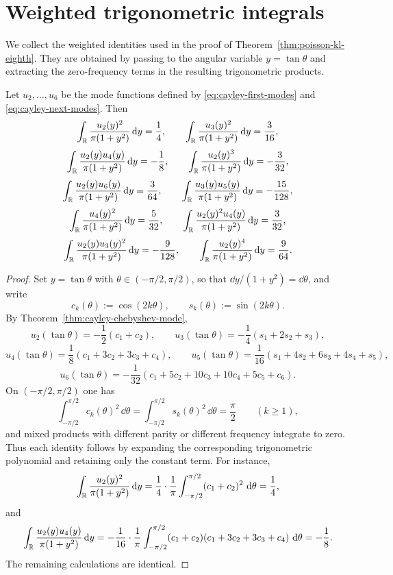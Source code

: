 \section{Weighted trigonometric integrals}\label{app:entropy-integrals}

We collect the weighted identities used in the proof of
Theorem~\ref{thm:poisson-kl-eighth}.  They are obtained by passing to
the angular variable $y=\tan\theta$ and extracting the zero-frequency
terms in the resulting trigonometric products.

\begin{lemma}\label{lem:entropy-integrals}
Let $u_2,\dots,u_6$ be the mode functions defined by
\eqref{eq:cayley-first-modes} and \eqref{eq:cayley-next-modes}.  Then
\[
\int_{\mathbb{R}}\frac{u_2(y)^2}{\pi(1+y^2)}\,\mathrm{d} y=\frac14,
\qquad
\int_{\mathbb{R}}\frac{u_3(y)^2}{\pi(1+y^2)}\,\mathrm{d} y=\frac{3}{16},
\]
\[
\int_{\mathbb{R}}\frac{u_2(y)u_4(y)}{\pi(1+y^2)}\,\mathrm{d} y=-\frac18,
\qquad
\int_{\mathbb{R}}\frac{u_2(y)^3}{\pi(1+y^2)}\,\mathrm{d} y=-\frac{3}{32},
\]
\[
\int_{\mathbb{R}}\frac{u_2(y)u_6(y)}{\pi(1+y^2)}\,\mathrm{d} y=\frac{3}{64},
\qquad
\int_{\mathbb{R}}\frac{u_3(y)u_5(y)}{\pi(1+y^2)}\,\mathrm{d} y=-\frac{15}{128},
\]
\[
\int_{\mathbb{R}}\frac{u_4(y)^2}{\pi(1+y^2)}\,\mathrm{d} y=\frac{5}{32},
\qquad
\int_{\mathbb{R}}\frac{u_2(y)^2u_4(y)}{\pi(1+y^2)}\,\mathrm{d} y=\frac{3}{32},
\]
\[
\int_{\mathbb{R}}\frac{u_2(y)u_3(y)^2}{\pi(1+y^2)}\,\mathrm{d} y=-\frac{9}{128},
\qquad
\int_{\mathbb{R}}\frac{u_2(y)^4}{\pi(1+y^2)}\,\mathrm{d} y=\frac{9}{64}.
\]
\end{lemma}

\begin{proof}
Set $y=\tan\theta$ with $\theta\in(-\pi/2,\pi/2)$, so that
$\dd y/(1+y^2)=\dd\theta$, and write
\[
c_k(\theta):=\cos(2k\theta),
\qquad
s_k(\theta):=\sin(2k\theta).
\]
By Theorem~\ref{thm:cayley-chebyshev-mode},
\[
u_2(\tan\theta)=-\frac12(c_1+c_2),
\qquad
u_3(\tan\theta)=-\frac14(s_1+2s_2+s_3),
\]
\[
u_4(\tan\theta)=\frac18(c_1+3c_2+3c_3+c_4),
\qquad
u_5(\tan\theta)=\frac1{16}(s_1+4s_2+6s_3+4s_4+s_5),
\]
\[
u_6(\tan\theta)=-\frac1{32}(c_1+5c_2+10c_3+10c_4+5c_5+c_6).
\]
On $(-\pi/2,\pi/2)$ one has
\[
\int_{-\pi/2}^{\pi/2} c_k(\theta)^2\,\dd\theta
=\int_{-\pi/2}^{\pi/2} s_k(\theta)^2\,\dd\theta
=\frac{\pi}{2}
\qquad(k\ge 1),
\]
and mixed products with different parity or different frequency
integrate to zero.  Thus each identity follows by expanding the
corresponding trigonometric polynomial and retaining only the constant
term.  For instance,
\[
\int_{\mathbb{R}}\frac{u_2(y)^2}{\pi(1+y^2)}\,\mathrm{d} y
=\frac14\cdot\frac1\pi\int_{-\pi/2}^{\pi/2}(c_1+c_2)^2\,\,\mathrm{d}\theta
=\frac14,
\]
and
\[
\int_{\mathbb{R}}\frac{u_2(y)u_4(y)}{\pi(1+y^2)}\,\mathrm{d} y
=-\frac1{16}\cdot\frac1\pi\int_{-\pi/2}^{\pi/2}
(c_1+c_2)(c_1+3c_2+3c_3+c_4)\,\,\mathrm{d}\theta
=-\frac18.
\]
The remaining calculations are identical.
\end{proof}
